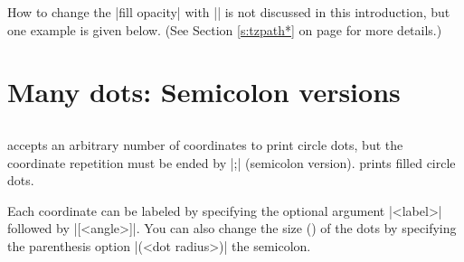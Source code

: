 \begin{tzcode}{.3}
\end{tzcode}

How to change the |fill opacity| with |\tzpath*| is not discussed in this introduction, but one example is given below. (See Section \ref{s:tzpath*} on page \pageref{s:tzpath*} for more details.)

\begin{tzcode}{.3}
\end{tzcode}



\section{Many dots: Semicolon versions}
\label{si:manydots}

\subsection{\protect\cmd{\tzcdots(*)}}
\label{ssi:tzcdots}

\icmd{\tzcdots} accepts an arbitrary number of coordinates to print circle dots, but the coordinate repetition must be ended by |;| (semicolon version).
\icmd{\tzcdots*} prints filled circle dots.

\begin{tzcode}{.3}
\end{tzcode}

Each coordinate can be labeled by specifying the optional argument |{<label>}| followed by |[<angle>]|. You can also change the size () of the dots by specifying the  parenthesis option |(<dot radius>)|  the semicolon.

\begin{tzcode}{.3}
\end{tzcode}



